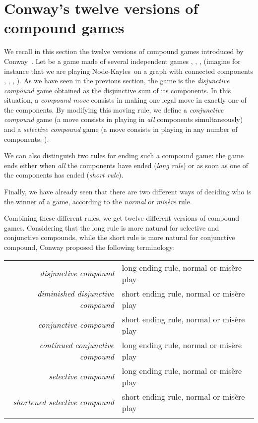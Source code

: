 \documentclass[11pt]{article}
\newcommand{\modif}[1]{\textcolor{black}{#1}}
\newcommand{\NK}{Node-Kayles}
\begin{document}
\section{Conway's twelve versions of compound games}
\label{sec:conway}

We recall in this section the twelve versions of compound games
introduced by Conway~\cite[Chapter~14]{ONAG}. 
Let  be a game
made of several independent games , , , 
(imagine for instance that we are playing \NK\ on a graph
 with connected components , , , ).
As we have seen in the previous section, 
the game  is the {\em disjunctive compound} game obtained
as the disjunctive sum of its components. In this situation,
a {\em compound move} consists in making one legal move in
exactly one of the components.
By modifying this moving rule, we define a {\em conjunctive
compound} game (a move consists in playing in {\em all}
components \modif{simultaneously}) and a {\em selective compound}
game (a move consists in playing in any number  of components,
).

We can also distinguish two rules for ending such a compound game:
the game ends either when {\em all} the components have ended 
({\em long rule}) or as soon as one of the components has ended
({\em short rule}).

Finally, we have already seen that there are two different ways of deciding
who is the winner of a game, according to the {\em normal}
or {\em mis\`ere} rule.

Combining these different rules, we get twelve different versions of
compound games. Considering that the long rule is more natural for
selective and conjunctive compounds, while the short rule is more
natural for conjunctive compound, Conway proposed the following
terminology:

\begin{tabular}{rl}
  \\
  {\em disjunctive compound} & long ending rule, normal or mis\`ere play \\
  {\em diminished disjunctive compound} & short ending rule, normal or mis\`ere play \\
  {\em conjunctive compound} & short ending rule, normal or mis\`ere play \\
  {\em continued conjunctive compound} & long ending rule, normal or mis\`ere play \\
  {\em selective compound} & long ending rule, normal or mis\`ere play \\
  {\em shortened selective compound} & short ending rule, normal or mis\`ere play \\
  \\
\end{tabular}
\end{document}
